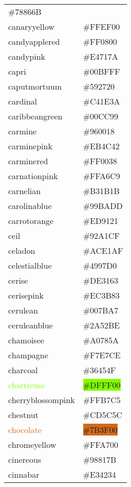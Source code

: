\documentclass[
]{article}
\begin{document}
\begin{longtable}[]{@{}ll@{}}
\colorbox{camouflagegreen}{\#78866B}\tabularnewline
\textcolor{canaryyellow}{canaryyellow} &
\colorbox{canaryyellow}{\#FFEF00}\tabularnewline
\textcolor{candyapplered}{candyapplered} &
\colorbox{candyapplered}{\#FF0800}\tabularnewline
\textcolor{candypink}{candypink} &
\colorbox{candypink}{\#E4717A}\tabularnewline
\textcolor{capri}{capri} & \colorbox{capri}{\#00BFFF}\tabularnewline
\textcolor{caputmortuum}{caputmortuum} &
\colorbox{caputmortuum}{\#592720}\tabularnewline
\textcolor{cardinal}{cardinal} &
\colorbox{cardinal}{\#C41E3A}\tabularnewline
\textcolor{caribbeangreen}{caribbeangreen} &
\colorbox{caribbeangreen}{\#00CC99}\tabularnewline
\textcolor{carmine}{carmine} &
\colorbox{carmine}{\#960018}\tabularnewline
\textcolor{carminepink}{carminepink} &
\colorbox{carminepink}{\#EB4C42}\tabularnewline
\textcolor{carminered}{carminered} &
\colorbox{carminered}{\#FF0038}\tabularnewline
\textcolor{carnationpink}{carnationpink} &
\colorbox{carnationpink}{\#FFA6C9}\tabularnewline
\textcolor{carnelian}{carnelian} &
\colorbox{carnelian}{\#B31B1B}\tabularnewline
\textcolor{carolinablue}{carolinablue} &
\colorbox{carolinablue}{\#99BADD}\tabularnewline
\textcolor{carrotorange}{carrotorange} &
\colorbox{carrotorange}{\#ED9121}\tabularnewline
\textcolor{ceil}{ceil} & \colorbox{ceil}{\#92A1CF}\tabularnewline
\textcolor{celadon}{celadon} &
\colorbox{celadon}{\#ACE1AF}\tabularnewline
\textcolor{celestialblue}{celestialblue} &
\colorbox{celestialblue}{\#4997D0}\tabularnewline
\textcolor{cerise}{cerise} & \colorbox{cerise}{\#DE3163}\tabularnewline
\textcolor{cerisepink}{cerisepink} &
\colorbox{cerisepink}{\#EC3B83}\tabularnewline
\textcolor{cerulean}{cerulean} &
\colorbox{cerulean}{\#007BA7}\tabularnewline
\textcolor{ceruleanblue}{ceruleanblue} &
\colorbox{ceruleanblue}{\#2A52BE}\tabularnewline
\textcolor{chamoisee}{chamoisee} &
\colorbox{chamoisee}{\#A0785A}\tabularnewline
\textcolor{champagne}{champagne} &
\colorbox{champagne}{\#F7E7CE}\tabularnewline
\textcolor{charcoal}{charcoal} &
\colorbox{charcoal}{\#36454F}\tabularnewline
\textcolor{chartreuse}{chartreuse} &
\colorbox{chartreuse}{\#DFFF00}\tabularnewline
\textcolor{cherryblossompink}{cherryblossompink} &
\colorbox{cherryblossompink}{\#FFB7C5}\tabularnewline
\textcolor{chestnut}{chestnut} &
\colorbox{chestnut}{\#CD5C5C}\tabularnewline
\textcolor{chocolate}{chocolate} &
\colorbox{chocolate}{\#7B3F00}\tabularnewline
\textcolor{chromeyellow}{chromeyellow} &
\colorbox{chromeyellow}{\#FFA700}\tabularnewline
\textcolor{cinereous}{cinereous} &
\colorbox{cinereous}{\#98817B}\tabularnewline
\textcolor{cinnabar}{cinnabar} &
\colorbox{cinnabar}{\#E34234}\tabularnewline

\end{longtable}
\end{document}
